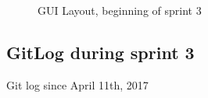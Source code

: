 \documentclass[11pt]{article} %
\begin{document}
    \begin{figure}[H]
  	\centering
  	\caption{GUI Layout, beginning of sprint 3}
  	\label{fig:GUI Design Start Sprint 3}
  \end{figure}

\newpage
\subsection{GitLog during sprint 3}
Git log since April 11th, 2017



%
\end{document}
